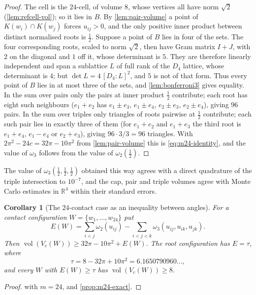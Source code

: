 \documentclass[11pt,reqno]{amsart}
\renewcommand{\_}{\origunderscore\allowbreak}
\numberwithin{equation}{section}
\theoremstyle{plain}
\newtheorem{cor}[thm]{Corollary}
\theoremstyle{definition}
\theoremstyle{remark}
\DeclareMathOperator{\vol}{vol}
\begin{document}
\begin{proof}
The cell is the $24$-cell, of volume $8$, whose vertices all have norm
$\sqrt2$ (\cref{lem:refcell-vol}); so it lies in $B$. By
\cref{lem:pair-volume} a point of $K(w_i)\cap K(w_j)$ forces
$u_{ij}>0$, and the only positive inner product between distinct
normalised roots is $\tfrac12$. Suppose a point of $B$ lies in four of
the sets. The four corresponding roots, scaled to norm $\sqrt2$, then
have Gram matrix $I+J$, with $2$ on the diagonal and $1$ off it, whose
determinant is $5$. They are therefore linearly independent and span a
sublattice $L$ of full rank of the $D_4$ lattice, whose determinant is
$4$; but $\det L=4\,[D_4:L]^2$, and $5$ is not of that form. Thus every
point of $B$ lies in at most three of the sets, and
\cref{lem:bonferroni3} gives equality. In the sum over pairs only the
pairs at inner product $\tfrac12$ contribute; each root has eight such
neighbours ($e_1+e_2$ has $e_1\pm e_3$, $e_1\pm e_4$, $e_2\pm e_3$,
$e_2\pm e_4$), giving $96$ pairs. In the sum over triples only triangles
of roots pairwise at $\tfrac12$ contribute; each such pair lies in
exactly three of them (for $e_1+e_2$ and $e_1+e_3$ the third root is
$e_1+e_4$, $e_1-e_4$ or $e_2+e_3$), giving $96\cdot3/3=96$ triangles.
With $2\pi^2-24c=32\pi-10\pi^2$ from \cref{lem:pair-volume} this is
\eqref{eq:m24-identity}, and the value of $\omega_3$ follows from the
value of $\omega_2(\tfrac12)$.
\end{proof}

The value of $\omega_3(\tfrac12,\tfrac12,\tfrac12)$ obtained this way
agrees with a direct quadrature of the triple intersection to
$10^{-7}$, and the cap, pair and triple volumes agree with Monte Carlo
estimates in $\mathbb{R}^4$ within their standard errors.

\begin{cor}[The $24$-contact case as an inequality between angles]\label{cor:m24-reduction}
For a contact configuration $W=\{w_1,\dots,w_{24}\}$ put
\[
  E(W)=\sum_{i<j}\omega_2(u_{ij})-\sum_{i<j<k}\omega_3(u_{ij},u_{ik},u_{jk}).
\]
Then $\vol(V_c(W))\ge32\pi-10\pi^2+E(W)$. The root configuration has
$E=\tau$, where
\[
  \tau=8-32\pi+10\pi^2=6.1650790960\ldots,
\]
and every $W$ with $E(W)\ge\tau$ has $\vol(V_c(W))\ge8$.
\end{cor}

\begin{proof}
 with $m=24$, and \cref{prop:m24-exact}.
\end{proof}
\end{document}
